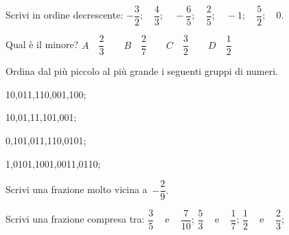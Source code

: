 \begin{esercizio}
\label{ese:3.33}
Scrivi in ordine decrescente:
% 
\(-\dfrac{3}{2}; \quad \dfrac{4}{3}; \quad -\dfrac{6}{5}; \quad 
\dfrac{2}{5}; \quad -1; \quad \dfrac{5}{2}; \quad 0.\)
\end{esercizio}

 \begin{esercizio}
\label{ese:3.34}
Qual è il minore? \qquad
\(\boxed{A} \quad \dfrac{2}{3} \quad \quad
  \boxed{B} \quad \dfrac{2}{7} \quad \quad
  \boxed{C} \quad \dfrac{3}{2} \quad \quad
  \boxed{D} \quad \dfrac{1}{2}\)
\end{esercizio}

\begin{esercizio}
\label{ese:3.36}
Ordina dal più piccolo al più grande i seguenti gruppi di numeri.

\begin{htmulticols}{2}
\begin{enumeratees}
\item 10,011,110,001,100;
\item 10,01,11,101,001;
\item 0,101,011,110,0101;
\item 1,0101,1001,0011,0110;
\end{enumeratees}
\end{htmulticols}
\end{esercizio}

\begin{esercizio}
\label{ese:3.37}
Scrivi una frazione molto vicina a~\(-\dfrac{2}{9}.\)
\end{esercizio}

\begin{esercizio}
\label{ese:3.38}
Scrivi una frazione compresa tra:\qquad 
\(\dfrac{3}{5}\) ~ e ~ \(\dfrac{7}{10}\); \qquad 
\(\dfrac{5}{3}\) ~ e ~ \(\dfrac{1}{7}\); \qquad 
\(\dfrac{1}{2}\) ~ e ~ \(\dfrac{2}{3}\);
\end{esercizio}

